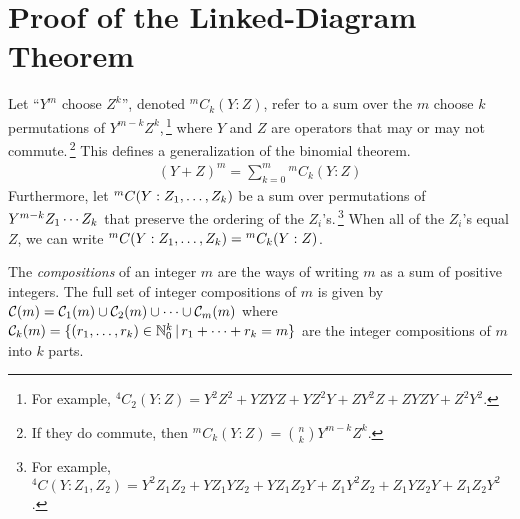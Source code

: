 \documentclass[11pt]{article}
\numberwithin{equation}{section}
\begin{document}





\newpage
\appendix
\section{Proof of the Linked-Diagram Theorem}\label{app:linked-diagram-theorem}

\begin{ntt}\label{ntt:operator-combinations}
Let
``$Y^m$ choose $Z^k$'', denoted ${}^mC_k(Y:Z)$,
refer to a sum over the $m$ choose $k$ permutations of $Y^{m-k}Z^k$,\,\footnote{For example,
$
  {}^4C_2(Y:Z)
=
  Y^2Z^2
+
  YZYZ
+
  YZ^2Y
+
  ZY^2Z
+
  ZYZY
+
  Z^2Y^2
$.
}
where $Y$ and $Z$ are operators that may or may not commute.\,\footnote{
  If they do commute, then ${}^mC_k(Y:Z)={n\choose k}Y^{m-k}Z^k$.
}
This defines a generalization of the binomial theorem.
\begin{align}
\label{eq:generalized-binomial-theorem}
  (
    Y
  +
    Z
  )^m
=
  \sum_{k=0}^m
  {}^mC_k(Y:Z)
\end{align}
Furthermore, let
$
  {}^mC(Y:Z_1,\ldots,Z_k)
$
be a sum over permutations of
$
  Y^{m-k}
  Z_1\cdots Z_k
$ that preserve the ordering of the $Z_i$'s.\,\footnote{
  For example,
$
  {}^4C(Y:Z_1,Z_2)
=
  Y^2Z_1Z_2
+
  YZ_1YZ_2
+
  YZ_1Z_2Y
+
  Z_1Y^2Z_2
+
  Z_1YZ_2Y
+
  Z_1Z_2Y^2
$.
}
When all of the $Z_i$'s equal $Z$, we can write
$
  {}^mC(Y:Z_1,\ldots,Z_k)
=
  {}^mC_k(Y:Z)
$.
\end{ntt}

\begin{prop}
\label{prop:wavefunction-infinite-recursion}
\end{prop}

\begin{dfn}\label{dfn:integer-compositions}
The \textit{compositions} of an integer $m$ are the ways of writing $m$ as a sum of positive integers.
The full set of integer compositions of $m$ is given by
$
  \mathcal{C}(m)
=
  \mathcal{C}_1(m)
  \cup
  \mathcal{C}_2(m)
  \cup
  \cdots
  \cup
  \mathcal{C}_m(m)
$
where 
$
  \mathcal{C}_k(m)
=
  \{
    (r_1,\ldots,r_k)\in\mathbb{N}_0^k
  \,|\,
    r_1+\cdots+r_k
  =
    m
  \}
$
are the integer compositions of $m$ into $k$ parts.
\end{dfn}
\end{document}
